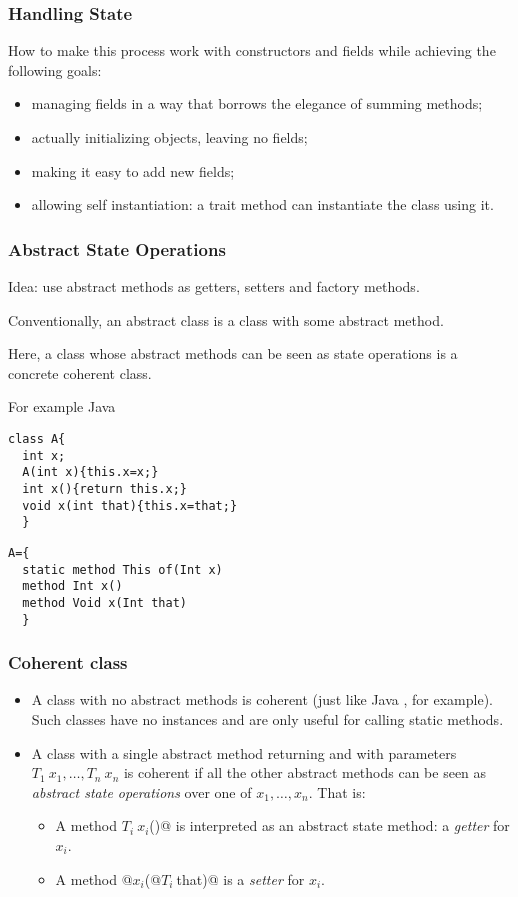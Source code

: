 \begin{frame}[fragile]
\frametitle{Handling State}
How to make this process work with constructors and fields
while achieving the following goals:
\begin{itemize}
\item managing fields in a way that borrows the elegance of summing methods;
\item actually initializing objects, leaving no \Q@null@ fields;
\item making it easy to add new fields;
\item allowing self instantiation: a trait method can instantiate the class using it.
\end{itemize}

\end{frame}

\begin{frame}[fragile]
\frametitle{Abstract State Operations}
Idea: use abstract methods as getters, setters and factory methods.

Conventionally, an abstract class is a class with some abstract method.

Here, a class whose abstract methods can be seen as state operations is a
concrete coherent class.

For example
Java
\begin{lstlisting}
class A{
  int x;
  A(int x){this.x=x;}
  int x(){return this.x;}
  void x(int that){this.x=that;}
  }
\end{lstlisting}

\name
\begin{lstlisting}
A={
  static method This of(Int x)
  method Int x()
  method Void x(Int that)
  }
\end{lstlisting}
\end{frame}

\begin{frame}[fragile]
\frametitle{Coherent class}
\begin{itemize}
\item A class with no abstract methods is coherent (just like Java
  \Q@Math@, for example). Such classes have no instances and are only useful for calling static methods.
\item A class with a single abstract \Q@static@ method 
returning \Q@This@ and with parameters $T_1\ x_1, \ldots, T_n\ x_n$
is coherent if all the other abstract methods can be seen as \emph{abstract state
operations} over one of $x_1, \ldots, x_n$.
That is:
\begin{itemize}
\item A method $T_i\ x_i$\Q@()@ is interpreted as an abstract state method: a \emph{getter} for $x_i$.
\item A method \Q@void @$x_i$\Q@(@$T_i\ $\Q@ that)@ is a \emph{setter} for $x_i$.
\end{itemize}
\end{itemize}
\end{frame}


